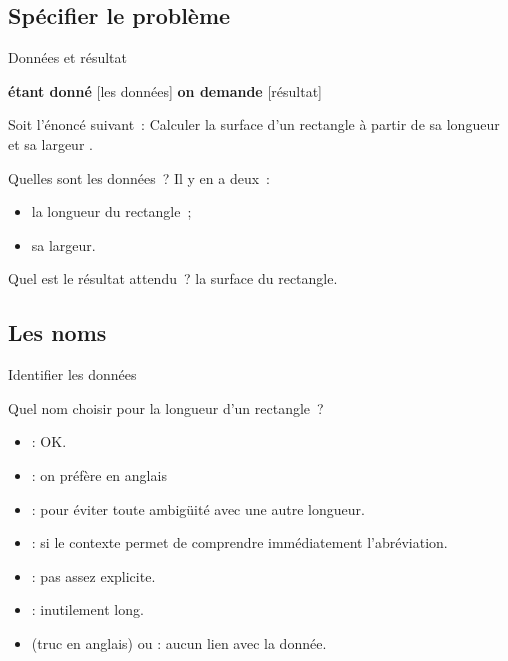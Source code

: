 \begin{hideedit}
\section{Spécifier le problème}
\frame{\sectionpage}
\begin{frame}{Données et résultat}
  \begin{block}{}
  \begin{center}
    {\textbf{étant donné} [les données] 
    \textbf{on demande} [résultat]}
  \end{center}
  \end{block}
  \pause
  \begin{example}
    Soit l’énoncé suivant~:
    \og
      Calculer la surface d’un rectangle 
      à partir de sa longueur et sa largeur
    \fg.

    Quelles sont les données~? \pause Il y en a deux~:
    \begin{itemize}
            \item la longueur du rectangle~;
            \item sa largeur.
    \end{itemize}

    \pause
    Quel est le résultat attendu~? \pause la surface du rectangle.
  \end{example}
\end{frame}

\subsection{Les noms}
\begin{frame}{Identifier les données}

  \begin{example}
  Quel nom choisir pour la longueur d’un rectangle~?

  \pause
  \begin{itemize}
    \item
       \pause: OK.
    \pause
    \item
       \pause: on préfère en anglais
    \pause
    \item
       \pause: pour éviter toute ambigüité avec une
      autre longueur.
    \pause
    \item
       \pause: si le contexte permet de comprendre immédiatement
      l’abréviation.
    \pause
    \item
       \pause: pas assez explicite.
    \pause
    \item
       \pause: inutilement long.
    \pause
    \item
       (truc en anglais) ou \pause: aucun lien avec la donnée.
  \end{itemize}
  \end{example}
\end{frame}


\end{hideedit}
